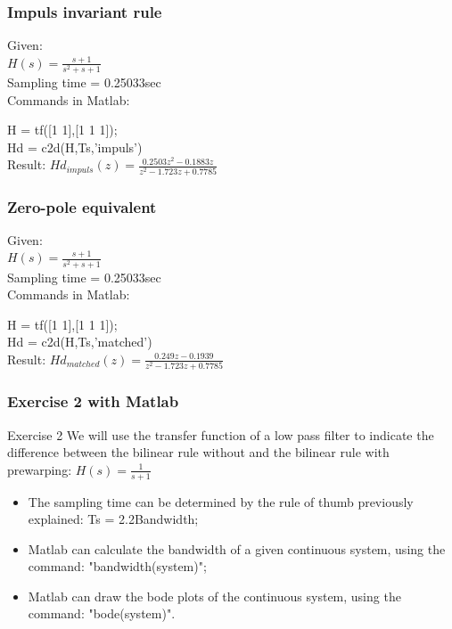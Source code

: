 \begin{frame}
	\frametitle{Impuls invariant rule}
	\begin{example}
		Given:\\
		$H(s) = \frac{s + 1}{s^{2} + s + 1}$\\
		Sampling time = 0.25033sec\\
		\vspace{1em}
		Commands in Matlab:
		
		H = tf([1 1],[1 1 1]); \\
		Hd = c2d(H,Ts,'impuls')\\
		\vspace{1em}
		Result:
		$Hd_{impuls}(z) = \frac{0.2503z^{2} - 0.1883z}{z^{2} - 1.723z + 0.7785}$
	\end{example}
\end{frame}

\begin{frame}
	\frametitle{Zero-pole equivalent}
	\begin{example}
		Given:\\
		$H(s) = \frac{s + 1}{s^{2} + s + 1}$\\
		Sampling time = 0.25033sec\\
		\vspace{1em}
		Commands in Matlab:
		
		H = tf([1 1],[1 1 1]); \\
		Hd = c2d(H,Ts,'matched')\\
		\vspace{1em}
		Result: 
		$Hd_{matched}(z) = \frac{0.249z - 0.1939}{z^{2} - 1.723z + 0.7785}$
	\end{example}
\end{frame}

\begin{frame}
	\frametitle{Exercise 2 with Matlab}
	\begin{block}{Exercise 2}
		We will use the transfer function of a low pass filter to indicate the difference between the bilinear rule without and the bilinear rule with prewarping: $H(s) = \frac{1}{s + 1}$
		\begin{itemize}
			\item The sampling time can be determined by the rule of thumb previously explained: Ts = 2.2Bandwidth;
			\item Matlab can calculate the bandwidth of a given continuous system, using the command: "bandwidth(system)";
			\item Matlab can draw the bode plots of the continuous system, using the command: "bode(system)".
		\end{itemize}
	\end{block}
\end{frame}

